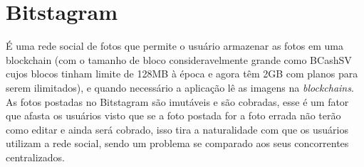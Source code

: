 \section{Bitstagram}

É uma rede social de fotos que permite o usuário armazenar as fotos em uma blockchain (com o tamanho de bloco consideravelmente grande como BCashSV~\cite{BTCSV} cujos blocos tinham limite de 128MB à época e agora têm 2GB com planos para serem ilimitados), e quando necessário a aplicação lê as imagens na \textit{blockchains}.
As fotos postadas no Bitstagram são imutáveis e são cobradas, esse é um fator que afasta os usuários visto que se a foto postada for a foto errada não terão como editar e ainda será cobrado, isso tira a naturalidade com que os usuários utilizam a rede social, sendo um problema se comparado aos seus concorrentes centralizados.









